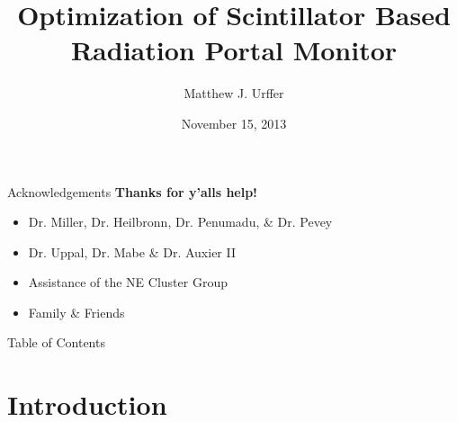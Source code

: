 \documentclass[compress]{beamer}
\title[Dissertation]{Optimization of Scintillator Based Radiation Portal Monitor}
\author[] { Matthew J. Urffer}
\institute[University of Tennessee] {Department of Nuclear Engineering, University of Tennessee, Knoxville, TN}
\date{November 15, 2013}
\begin{document}
\begin{frame}[plain]
  \titlepage
  \tiny
    \begin{center}
  \end{center}
\end{frame}
\begin{frame}{Acknowledgements}
\textbf{Thanks for y'alls help!}
\vspace{1cm}
  \begin{itemize}
    \item Dr. Miller, Dr. Heilbronn, Dr. Penumadu, \& Dr. Pevey
    \item Dr. Uppal, Dr. Mabe \& Dr. Auxier II
    \item Assistance of the NE Cluster Group
    \item Family \& Friends
  \end{itemize}
\end{frame}
\begin{frame}{Table of Contents}
  \label{toc}
  \begin{multicols}{2}
    \tableofcontents
  \end{multicols}
\end{frame}


\section{Introduction}

\end{document}
